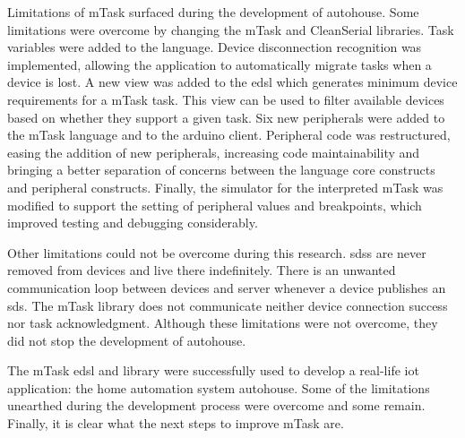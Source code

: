 Limitations of \gls{mTask} surfaced during the development of \gls{autohouse}. Some limitations were overcome by changing the \gls{mTask} and CleanSerial libraries. Task variables were added to the language. Device disconnection recognition was implemented, allowing the application to automatically migrate tasks when a device is lost. A new view was added to the \ac{edsl} which generates minimum device requirements for a \gls{mTask} task. This view can be used to filter available devices based on whether they support a given task. Six new peripherals were added to the \gls{mTask} language and to the \gls{arduino} client. Peripheral code was restructured, easing the addition of new peripherals, increasing code maintainability and bringing a better separation of concerns between the language core constructs and peripheral constructs. Finally, the simulator for the interpreted \gls{mTask} was modified to support the setting of peripheral values and breakpoints, which improved testing and debugging considerably.

Other limitations could not be overcome during this research. \acsp{sds} are never removed from devices and live there indefinitely. There is an unwanted communication loop between devices and server whenever a device publishes an \acs{sds}. The \gls{mTask} library does not communicate neither device connection success nor task acknowledgment. Although these limitations were not overcome, they did not stop the development of \gls{autohouse}. 

The \gls{mTask} \acs{edsl} and library were successfully used to develop a real-life \acs{iot} application: the home automation system \gls{autohouse}. Some of the limitations unearthed during the development process were overcome and some remain. Finally, it is clear what the next steps to improve \gls{mTask} are.